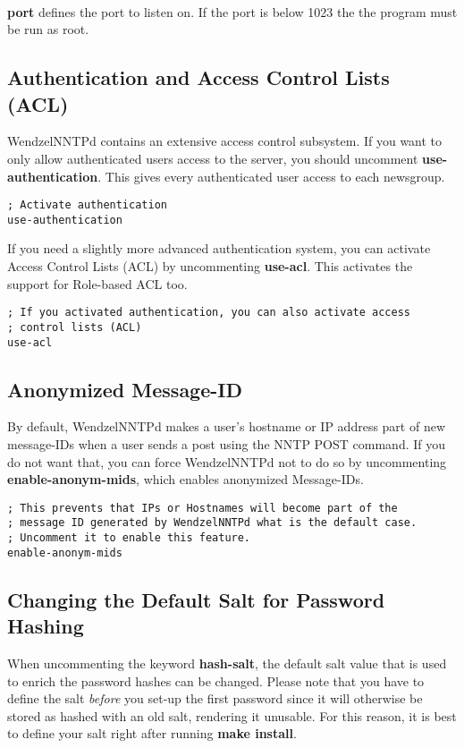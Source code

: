 ~

\textbf{port} defines the port to listen on. If the port is below 1023 the the program must be run as root.

\subsection{Authentication and Access Control Lists (ACL)}

WendzelNNTPd contains an extensive access control subsystem. If you want to only allow authenticated users access to the server, you should uncomment \textbf{use-authentication}. This gives every authenticated user access to each newsgroup.

\begin{verbatim}
; Activate authentication
use-authentication
\end{verbatim}

If you need a slightly more advanced authentication system, you can activate Access Control Lists (ACL) by uncommenting \textbf{use-acl}. This activates the support for Role-based ACL too.

\begin{verbatim}
; If you activated authentication, you can also activate access
; control lists (ACL)
use-acl
\end{verbatim}

\subsection{Anonymized Message-ID}

By default, WendzelNNTPd makes a user's hostname or IP address part of new message-IDs when a user sends a post using the NNTP POST command. If you do not want that, you can force WendzelNNTPd not to do so by uncommenting \textbf{enable-anonym-mids}, which enables anonymized Message-IDs.

\begin{verbatim}
; This prevents that IPs or Hostnames will become part of the
; message ID generated by WendzelNNTPd what is the default case.
; Uncomment it to enable this feature.
enable-anonym-mids
\end{verbatim}

\subsection{Changing the Default Salt for Password Hashing}

When uncommenting the keyword \textbf{hash-salt}, the default salt value that is used to enrich the password hashes can be changed. Please note that you have to define the salt \textit{before} you set-up the first password since it will otherwise be stored as hashed with an old salt, rendering it unusable. For this reason, it is best to define your salt right after running \textbf{make install}.

